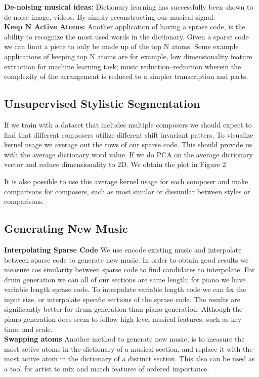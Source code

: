 \documentclass[11pt,a4paper]{article}
\begin{document}
 \textbf{De-noising musical ideas: } Dictionary learning has successfully been shown to de-noise image, videos. By simply reconstructing our musical signal. 
\\
 \textbf{Keep N Active Atoms: } Another application of having a sprase code, is the ability to recognize the most used words in the dictionary. Given a sparse code we can limit a piece to only be made up of the top N atoms. Some example applications of keeping top N atoms are for example, low dimensionality feature extraction for machine learning task; music reduction--reduction wherein the complexity of the arrangement is reduced to a simpler transcription and parts. 

\subsection{Unsupervised Stylistic Segmentation }
If we train with a dataset that includes multiple composers we should expect to find that different composers utilize different shift invariant patters. To visualize kernel usage we average out the rows of our sparse code. This should provide us with the average dictionary word value. If we do PCA on the average dictionary vector and reduce dimensionality to 2D. We obtain the plot in Figure 2

It is also possible to use this average kernel usage for each composer and make comparisons for composers, such as most similar or dissimilar between styles or comparisons. 


\subsection{Generating New Music}
 \textbf{Interpolating Sparse Code } We use encode existing music and interpolate between sparse code to generate new music. In order to obtain good results we measure cos similarity between sparse code to find candidates to interpolate. For drum generation we can all of our sections are same length; for piano we have variable length sprase code. To interpolate variable length code we can fix the input size, or interpolate specific sections of the sprase code. The results are significantly better for drum generation than piano generation. Although the piano generation does seem to follow high level musical features, such as key time, and scale.
 \\
 \textbf{Swapping atoms } Another method to generate new music, is to measure the most active atoms in the dictionary of a musical section, and replace it with the most active atom in the dictionary of a distinct section. This also can be used as a tool for artist to mix and match features of ordered importance. 
\end{document}
